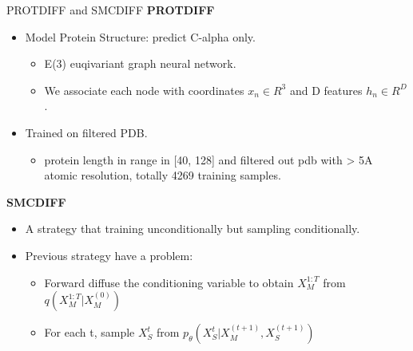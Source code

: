 \documentclass[notheorems, aspectratio=54]{beamer}
\begin{document}
\begin{frame}{PROTDIFF and SMCDIFF}
  \textbf{PROTDIFF}
  \begin{itemize}
    \item Model Protein Structure: predict C-alpha only.
    \begin{itemize}
      \item E(3) euqivariant graph neural network.
      \item We associate each node with coordinates $x_n \in R^3$ and D features $h_n \in R^D$.
    \end{itemize}
    \item Trained on filtered PDB.
    \begin{itemize}
      \item protein length in range in [40, 128] and  filtered out pdb with > 5A atomic resolution, totally 4269 training samples.
    \end{itemize}
  \end{itemize}
  \textbf{SMCDIFF}
  \begin{itemize}
    \item A strategy that training unconditionally but sampling conditionally.
    \item Previous strategy have a problem:
    \begin{itemize}
      \item Forward diffuse the conditioning variable to obtain $X_M^{1:T}$ from $q(X_M^{1:T}|X_M^{(0)})$
      \item For each t, sample $X_S^{t}$ from $p_{\theta}(X_S^{t}|X_M^{(t+1)}, X_S^{(t+1)})$
    \end{itemize}
  \end{itemize}
\end{frame}
\end{document}
